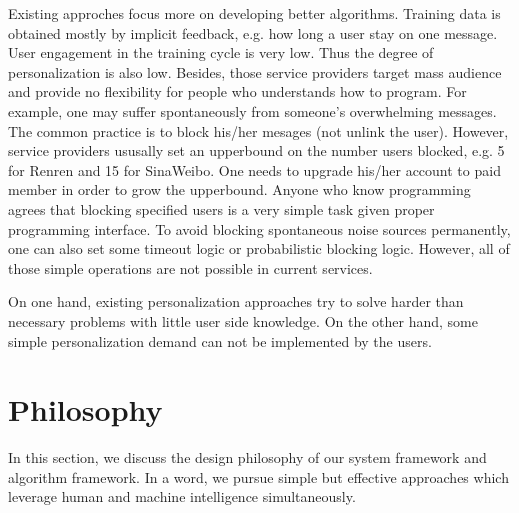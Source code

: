 \documentclass{sig-alternate}
\begin{document}
Existing approches focus more on developing better algorithms. 
Training data is obtained mostly by implicit feedback, 
e.g. how long a user stay on one message. 
User engagement in the training cycle is very low. 
Thus the degree of personalization is also low. 
Besides, those service providers target mass audience
and provide no flexibility for people who understands how to program. 
For example, one may suffer spontaneously from someone's overwhelming messages. 
The common practice is to block his/her mesages (not unlink the user). 
However, service providers ususally set an upperbound on the number users blocked, 
e.g. 5 for Renren and 15 for SinaWeibo. 
One needs to upgrade his/her account to paid member in order to grow the upperbound. 
Anyone who know programming agrees that blocking specified users
is a very simple task given proper programming interface. 
To avoid blocking spontaneous noise sources permanently, 
one can also set some timeout logic or probabilistic blocking logic. 
However, all of those simple operations are not possible in current services. 

On one hand, existing personalization approaches try to 
solve harder than necessary problems with little user side knowledge. 
On the other hand, some simple personalization demand 
can not be implemented by the users. 

\section{Philosophy}
\label{sec:Philosophy}

In this section, we discuss the design philosophy 
of our system framework and algorithm framework. 
In a word, we pursue simple but effective approaches
which leverage human and machine intelligence simultaneously. 
\end{document}
